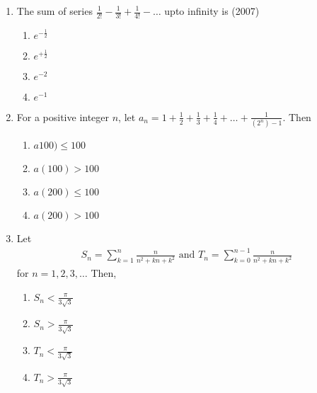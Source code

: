 \begin{enumerate}[label=\thesubsection.\arabic*,ref=\thesubsection.\theenumi]
    \item The sum of series $\frac{1}{2!}-\frac{1}{3!}+\frac{1}{4!}-\dots$ upto infinity is 
    \hfill(2007)
%
    \begin{enumerate}
    \item$e^{-\frac{1}{2}}$
    \item$e^{+\frac{1}{2}}$
    \item$e^{-2}$
    \item$e^{-1}$
    \end{enumerate}
\item For a positive integer $n$,  let
$a_n=1+\frac{1}{2}+\frac{1}{3}+\frac{1}{4}+\dots+\frac{1}{(2^n)-1}$. Then \hfill{}
\begin{multicols}{4}
\begin{enumerate}    
\item $a100)\leq 100$
\item $a(100) > 100$
\item $a(200)\leq 100$
\item $a(200) > 100$
\end{enumerate}
\end{multicols}
%
%
\item Let 
\begin{align*}
S_n=\sum_{k=1}^{n}\frac{n}{n^2+kn+k^2} \text{ and }   T_n=\sum_{k=0}^{n-1}\frac{n}{n^2+kn+k^2}
\end{align*}
for $n=1, 2, 3, \dots$ Then, \hfill{}
\begin{multicols}{4}
\begin{enumerate}    
\item $S_n<\frac{\pi}{3\sqrt{3}}$
\item $S_n>\frac{\pi}{3\sqrt{3}}$
\item $T_n<\frac{\pi}{3\sqrt{3}}$
\item $T_n>\frac{\pi}{3\sqrt{3}}$
\end{enumerate}
\end{multicols}
%
\end{enumerate}
